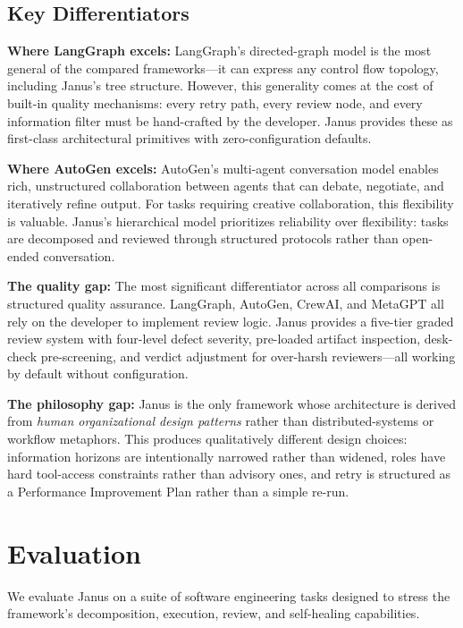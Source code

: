 \documentclass[11pt,a4paper]{article}
\begin{document}
\subsection{Key Differentiators}

\textbf{Where LangGraph excels:} LangGraph's directed-graph model is the most
general of the compared frameworks---it can express any control flow topology,
including Janus's tree structure. However, this generality comes at the cost
of built-in quality mechanisms: every retry path, every review node, and every
information filter must be hand-crafted by the developer. Janus provides these
as first-class architectural primitives with zero-configuration defaults.

\textbf{Where AutoGen excels:} AutoGen's multi-agent conversation model enables
rich, unstructured collaboration between agents that can debate, negotiate, and
iteratively refine output. For tasks requiring creative collaboration, this
flexibility is valuable. Janus's hierarchical model prioritizes reliability
over flexibility: tasks are decomposed and reviewed through structured
protocols rather than open-ended conversation.

\textbf{The quality gap:} The most significant differentiator across all
comparisons is structured quality assurance. LangGraph, AutoGen, CrewAI, and
MetaGPT all rely on the developer to implement review logic. Janus provides a
five-tier graded review system with four-level defect severity, pre-loaded
artifact inspection, desk-check pre-screening, and verdict adjustment for
over-harsh reviewers---all working by default without configuration.

\textbf{The philosophy gap:} Janus is the only framework whose architecture is
derived from \emph{human organizational design patterns} rather than
distributed-systems or workflow metaphors. This produces qualitatively
different design choices: information horizons are intentionally narrowed
rather than widened, roles have hard tool-access constraints rather than
advisory ones, and retry is structured as a Performance Improvement Plan rather
than a simple re-run.

\section{Evaluation}

We evaluate Janus on a suite of software engineering tasks designed to stress
the framework's decomposition, execution, review, and self-healing capabilities.
\end{document}
